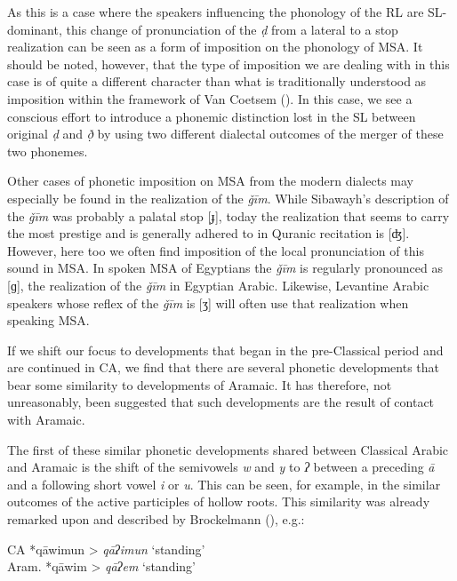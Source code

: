 \documentclass[output=paper]{langsci/langscibook}
\begin{document}
As this is a case where the speakers influencing the phonology of the RL are SL-dominant, this change of pronunciation of the \textit{ḍ} from a lateral to a stop realization can be seen as a form of imposition on the phonology of MSA. It should be noted, however, that the type of imposition we are dealing with in this case is of quite a different character than what is traditionally understood as imposition within the framework of Van Coetsem (\citeyear{VanCoetsem1988,VanCoetsem2000}). In this case, we see a conscious effort to introduce a phonemic distinction lost in the SL between original \textit{ḍ} and \textit{ð̣} by using two different dialectal outcomes of the merger of these two phonemes.

Other cases of phonetic imposition on MSA from the modern dialects may especially be found in the realization of the \textit{ǧīm}. While Sibawayh’s description of the \textit{ǧīm} was probably a palatal stop [ɟ], today the realization that seems to carry the most prestige and is generally adhered to in Quranic recitation is [ʤ]. However, here too we often find imposition of the local pronunciation of this sound in MSA. In spoken MSA of Egyptians the \textit{ǧīm} is regularly pronounced as [ɡ], the realization of the \textit{ǧīm} in Egyptian Arabic. Likewise, Levantine Arabic speakers whose reflex of the \textit{ǧīm} is [ʒ] will often use that realization when speaking MSA.

If we shift our focus to developments that began in the pre-Classical period and are continued in CA, we find that there are several phonetic developments that bear some similarity to developments of Aramaic. It has therefore, not unreasonably, been suggested that such developments are the result of contact with Aramaic.

The first of these similar phonetic developments shared between Classical Arabic and Aramaic is the shift of the semivowels  \textit{w} and \textit{y} to \textit{ʔ} between a preceding \textit{ā} and a following short vowel \textit{i} or \textit{u}. This can be seen, for example, in the similar outcomes of the active participles of hollow roots. This similarity was already remarked upon and described by Brockelmann (\citeyear[138--139]{Brockelmann1908}), e.g.:

\ea
\ea CA *qāwimun > \textit{qāʔimun} ‘standing’\\
\ex Aram. *qāwim > \textit{qāʔem} ‘standing’
\z
\z
\end{document}

